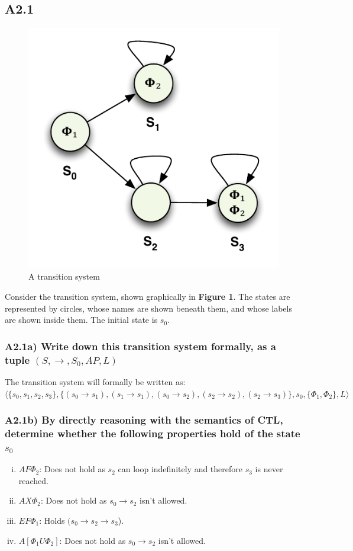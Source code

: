 \documentclass[12pt]{report}
\begin{document}
\subsection*{A2.1}
\begin{figure}[H]
	\centering
	\includegraphics[scale=0.75]{../GFX/ExerciseFigure1.pdf}
	\caption{A transition system}
\end{figure}

Consider the transition system, shown graphically in \textbf{Figure 1}. The states are represented by circles, whose names are shown beneath them, and whose labels are shown inside them. The initial state is $s_0$.

\subsubsection*{A2.1a) Write down this transition system formally, as a tuple $(S,\rightarrow,S_0,AP,L)$}
The transition system will formally be written as:\\
$\langle\{s_0,s_1,s_2,s_3\},\{(s_0 \rightarrow s_1),(s_1 \rightarrow s_1),(s_0 \rightarrow s_2),(s_2 \rightarrow s_2),(s_2 \rightarrow s_3)\},s_0,\{\Phi_1,\Phi_2\},L\rangle$

\subsubsection*{A2.1b) By directly reasoning with the semantics of CTL, determine whether the following properties hold of the state $s_0$}
\begin{enumerate}[i.]
	\item $AF \Phi_2$: Does not hold as $s_2$ can loop indefinitely and therefore $s_3$ is never reached.
	\item $AX \Phi_2$: Does not hold as $s_0 \rightarrow s_2$ isn't allowed.
	\item $EF \Phi_1$: Holds $(s_0 \rightarrow s_2 \rightarrow s_3$).
	\item $A[\Phi_1 U \Phi_2]$: Does not hold as $s_0 \rightarrow s_2$ isn't allowed.
\end{enumerate}
\end{document}
